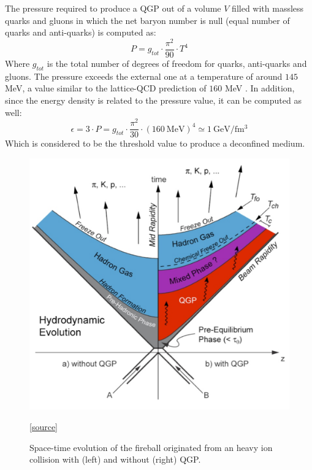 The pressure required to produce a QGP out of a volume $V$ filled with massless quarks and gluons in which the net baryon number is null (equal number of quarks and anti-quarks) is computed as:
\begin{equation}
P = g_{tot}\cdot\frac{\pi^2}{90}\cdot T^4
\end{equation}
Where $g_{tot}$ is the total number of degrees of freedom for quarks, anti-quarks and gluons.
The pressure exceeds the external one at a temperature of around $145$ MeV, a value similar to the lattice-QCD prediction of $160$ MeV \cite{Kapoyannis:2017hcz}.
In addition, since the energy density is related to the pressure value, it can be computed as well:
\begin{equation}
\epsilon = 3\cdot P = g_{tot}\cdot\frac{\pi^2}{30}\cdot (160\ \mathrm{MeV})^4 \simeq 1\ \mathrm{GeV/fm^3}
\end{equation}
Which is considered to be the threshold value to produce a deconfined medium.

\begin{figure}[!t]
\begin{center}
\includegraphics[width=0.85\linewidth]{Chapters/Introduction/Figs/QGP_evo.pdf}
\caption{Space-time evolution of the fireball originated from an heavy ion collision with (left) and without (right) QGP.}
\href{https://www.physi.uni-heidelberg.de/~reygers/lectures/2015/qgp/qgp2015_06_space_time_evo.pdf}{[source]}
\label{fig:evolution}
\end{center}
\end{figure}

